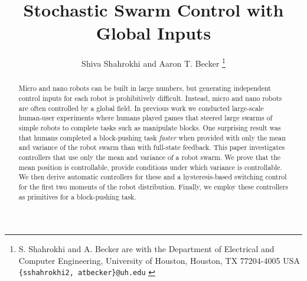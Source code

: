 \documentclass[letterpaper, 10 pt, conference]{ieeeconf}
\begin{document}


\title{\LARGE \bf 
Stochastic Swarm Control with Global Inputs
}
\author{Shiva Shahrokhi and  Aaron T. Becker%
\thanks{{S. Shahrokhi and A. Becker are with the Department of Electrical and Computer Engineering,  University of Houston, Houston, TX 77204-4005 USA {\tt\small  \{sshahrokhi2, atbecker\}@uh.edu}
}
} %
} %
\maketitle

\begin{abstract}
Micro and nano robots can be built in large numbers, but generating independent control inputs for each robot is prohibitively difficult.  Instead, micro and nano robots are often controlled by a global field.  In previous work we conducted large-scale human-user experiments where humans played games that steered large swarms of simple robots to complete tasks such as manipulate blocks. One surprising result was that humans completed a block-pushing task \emph{faster} when provided with only the mean and variance of the robot swarm than with full-state feedback.  This paper investigates controllers that use only the mean and variance of a robot swarm. We prove that the mean position is controllable, provide conditions under which variance is controllable.  We then derive automatic controllers for these and a hysteresis-based switching control for the first two moments of the robot distribution.  Finally, we employ these controllers as primitives for a block-pushing task.


   

\end{abstract}
\end{document}
